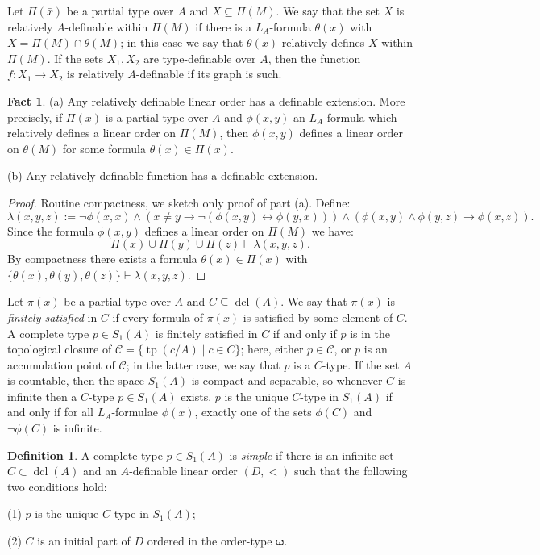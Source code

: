 \documentclass[12pt]{amsart}
\theoremstyle{definition}
\newtheorem{Definition}[Theorem]{Definition}
\newtheorem{Fact}[Theorem]{Fact}
\DeclareMathOperator{\dcl}{dcl}
\DeclareMathOperator{\tp}{tp}
\begin{document}
Let $\Pi(\bar x)$ be a partial type over $A$ and $X\subseteq \Pi(M)$. We say that the set $X$ is relatively $A$-definable within $\Pi(M)$ if there is a $L_A$-formula $\theta(x)$ with $X=\Pi(M)\cap \theta(M)$; in this case we say that $\theta(x)$ relatively defines $X$ within $\Pi(M)$. 
If the sets $X_1,X_2$ are type-definable over $A$, then the function $f: X_1\to X_2$  is relatively $A$-definable if its graph is such.


\begin{Fact}\label{Fact1}
(a) Any relatively definable linear order has a definable extension. More precisely, if $\Pi(x)$ is a partial type over $A$ and $\phi(x,y)$  an  $L_A$-formula which relatively defines a linear order on $\Pi(M)$, then $\phi(x,y)$ defines a linear order on $\theta(M)$ for some  formula $\theta(x)\in \Pi(x)$. 


(b)  Any relatively definable function has a definable extension. 
\end{Fact}
\begin{proof}
Routine compactness, we sketch only proof of part (a). Define:
$$\lambda(x,y,z):=\lnot\phi(x,x)\land (x\neq y\rightarrow \lnot(\phi(x,y)\leftrightarrow\phi(y,x)))\land (\phi(x,y)\land\phi(y,z)\rightarrow\phi(x,z)).$$
Since the formula $\phi(x,y)$ defines a linear order on $\Pi(M)$ we have:
$$\Pi(x)\cup\Pi(y)\cup\Pi(z)\vdash \lambda(x,y,z) .$$
By compactness there exists a formula $\theta(x)\in \Pi(x)$ with  $ \{\theta(x),\theta(y),\theta(z)\}\vdash\lambda(x,y,z)$.  
\end{proof}

Let  $\pi(x)$ be a partial type over $A$  and  $C\subseteq \dcl(A)$. We say that $\pi(x)$ is {\it finitely satisfied} in $C$ if every  formula of $\pi(x)$ is satisfied by some element of $C$. A complete type $p\in S_1(A)$ is finitely satisfied in $C$ if and only if $p$ is in the topological closure of $\mathcal C=\{\tp(c/A)\mid c\in C\}$; here, either  $p\in\mathcal C$, or $p$ is an accumulation point of $\mathcal C$; in the latter case,   we say that $p$ is a $C$-type. If the set $A$ is countable, then the space $S_1(A)$ is compact and separable, so whenever $C$ is infinite then a $C$-type $p\in S_1(A)$ exists. $p$ is the unique $C$-type in $S_1(A)$ if and only if for all $L_A$-formulae $\phi(x)$, exactly one of the sets $\phi(C)$ and $\lnot\phi(C)$ is infinite. 




\begin{Definition}\label{Definition_simple}
A complete type $p\in S_1(A)$ is {\it simple} if there is an infinite set $C\subset\dcl(A)$ and an $A$-definable linear order $(D,<)$ such that the following two conditions hold:

(1) $p$ is the unique $C$-type in $S_1(A)$;

(2) $C$ is an initial part of $D$ ordered in the order-type $\boldsymbol{\omega}$.
\end{Definition}
\end{document}
